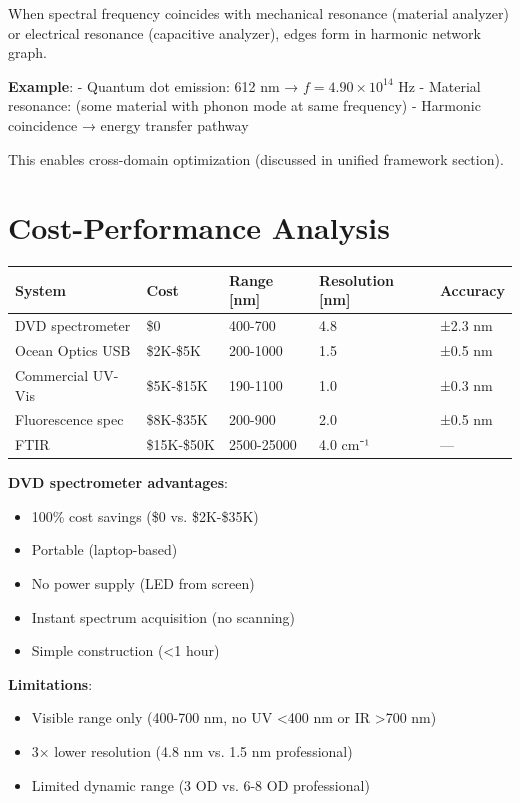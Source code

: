 \documentclass[12pt,a4paper]{article}
\begin{document}
When spectral frequency coincides with mechanical resonance (material analyzer) or electrical resonance (capacitive analyzer), edges form in harmonic network graph.

\textbf{Example}:
- Quantum dot emission: 612 nm → $f = 4.90 \times 10^{14}$ Hz
- Material resonance: (some material with phonon mode at same frequency)
- Harmonic coincidence → energy transfer pathway

This enables cross-domain optimization (discussed in unified framework section).

\section{Cost-Performance Analysis}

\begin{center}
\begin{tabular}{|l|l|l|l|l|}
\hline
\textbf{System} & \textbf{Cost} & \textbf{Range [nm]} & \textbf{Resolution [nm]} & \textbf{Accuracy} \\
\hline
DVD spectrometer & \$0 & 400-700 & 4.8 & ±2.3 nm \\
Ocean Optics USB & \$2K-\$5K & 200-1000 & 1.5 & ±0.5 nm \\
Commercial UV-Vis & \$5K-\$15K & 190-1100 & 1.0 & ±0.3 nm \\
Fluorescence spec & \$8K-\$35K & 200-900 & 2.0 & ±0.5 nm \\
FTIR & \$15K-\$50K & 2500-25000 & 4.0 cm⁻¹ & — \\
\hline
\end{tabular}
\end{center}

\textbf{DVD spectrometer advantages}:
\begin{itemize}
\item 100\% cost savings (\$0 vs. \$2K-\$35K)
\item Portable (laptop-based)
\item No power supply (LED from screen)
\item Instant spectrum acquisition (no scanning)
\item Simple construction (<1 hour)
\end{itemize}

\textbf{Limitations}:
\begin{itemize}
\item Visible range only (400-700 nm, no UV <400 nm or IR >700 nm)
\item 3× lower resolution (4.8 nm vs. 1.5 nm professional)
\item Limited dynamic range (3 OD vs. 6-8 OD professional)
\end{itemize}
\end{document}
